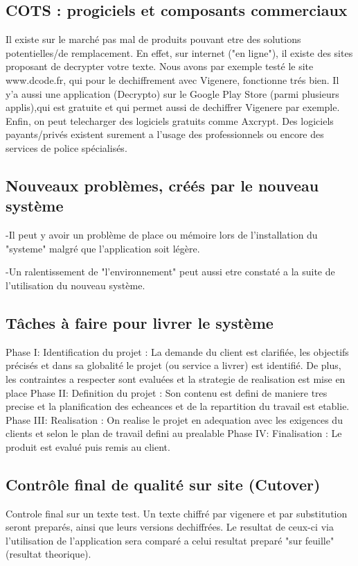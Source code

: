 \documentclass[a4]{article}
\begin{document}
		\subsection{COTS : progiciels et composants commerciaux}
		Il existe sur le marché pas mal de produits pouvant etre des solutions potentielles/de remplacement. En effet, 			sur internet
		("en ligne"), il existe des sites proposant de decrypter votre texte. Nous avons par exemple testé le site 			www.dcode.fr, qui
		pour le dechiffrement avec Vigenere, fonctionne trés bien.
		Il y'a aussi une application (Decrypto) sur le Google Play Store (parmi plusieurs applis),qui est gratuite et 			qui permet aussi de dechiffrer Vigenere par exemple.
		Enfin, on peut telecharger des logiciels gratuits comme Axcrypt. Des logiciels payants/privés existent surement 			a l'usage des
		professionnels ou encore des services de police spécialisés.
		\subsection{Nouveaux problèmes, créés par le nouveau système}
		-Il peut y avoir un problème de place ou mémoire lors de l'installation du "systeme" malgré que l'application 			soit légère.
		
		-Un ralentissement de "l'environnement" peut aussi etre constaté a la suite de l'utilisation du nouveau 			système.
		\subsection{Tâches à faire pour livrer le système}
		Phase I: Identification du projet : La demande du client est clarifiée, les objectifs précisés et dans sa 			globalité le projet (ou service a livrer) est identifié. De plus, les contraintes a respecter sont 				evaluées et la strategie de realisation est mise en place
		Phase II: Definition du projet : Son contenu est defini de maniere tres precise et la planification des 			echeances et de la repartition du travail est etablie.
		Phase III: Realisation : On realise le projet en adequation avec les exigences du clients et selon le plan de 			travail defini au prealable
		Phase IV: Finalisation : Le produit est evalué puis remis au client.
		
		
		
		\subsection{Contrôle final de qualité sur site (Cutover)}
		Controle final sur un texte test. Un texte chiffré par vigenere et par substitution seront preparés, ainsi que 			leurs versions dechiffrées. Le resultat de ceux-ci via l'utilisation de l'application sera comparé a celui resultat 				preparé "sur feuille"(resultat theorique). 
\end{document}

